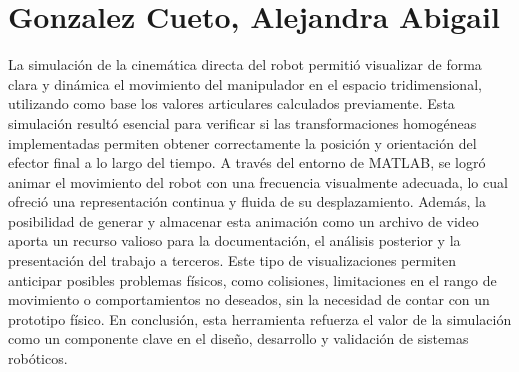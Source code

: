 \section{Gonzalez Cueto, Alejandra Abigail}
La simulación de la cinemática directa del robot permitió visualizar de forma clara y dinámica el movimiento del manipulador en el espacio tridimensional, utilizando como base los valores articulares calculados previamente. Esta simulación resultó esencial para verificar si las transformaciones homogéneas implementadas permiten obtener correctamente la posición y orientación del efector final a lo largo del tiempo. A través del entorno de MATLAB, se logró animar el movimiento del robot con una frecuencia visualmente adecuada, lo cual ofreció una representación continua y fluida de su desplazamiento. Además, la posibilidad de generar y almacenar esta animación como un archivo de video aporta un recurso valioso para la documentación, el análisis posterior y la presentación del trabajo a terceros. Este tipo de visualizaciones permiten anticipar posibles problemas físicos, como colisiones, limitaciones en el rango de movimiento o comportamientos no deseados, sin la necesidad de contar con un prototipo físico. En conclusión, esta herramienta refuerza el valor de la simulación como un componente clave en el diseño, desarrollo y validación de sistemas robóticos.